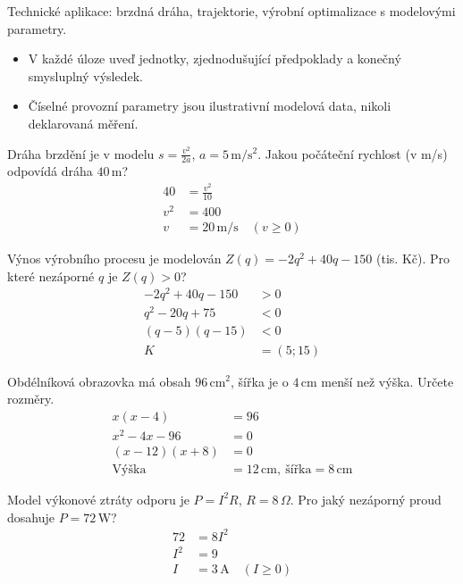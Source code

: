 \documentclass[11pt,a4paper]{article}
\begin{document}
Technické aplikace: brzdná dráha, trajektorie, výrobní optimalizace s modelovými parametry.
\begin{itemize}
\item V každé úloze uveď jednotky, zjednodušující předpoklady a konečný smysluplný výsledek.
\item Číselné provozní parametry jsou ilustrativní modelová data, nikoli deklarovaná měření.
\end{itemize}
\begin{prikladReseniBox}[title={Příklad 1}]
Dráha brzdění je v modelu $s=\frac{v^2}{2a}$, $a=5\,\mathrm{m/s^2}$. Jakou počáteční rychlost (v m/s) odpovídá dráha $40\,\mathrm m$?
\tcblower
\[
\begin{aligned}
40&=\frac{v^2}{10}\\[2pt]
v^2&=400\\[2pt]
v&=20\,\mathrm{m/s}\quad(v\ge0)
\end{aligned}
\]
\end{prikladReseniBox}
\begin{prikladReseniBox}[title={Příklad 2}]
Výnos výrobního procesu je modelován $Z(q)=-2q^2+40q-150$ (tis. Kč). Pro které nezáporné $q$ je $Z(q)>0$?
\tcblower
\[
\begin{aligned}
-2q^2+40q-150&>0\\[2pt]
q^2-20q+75&<0\\[2pt]
(q-5)(q-15)&<0\\[2pt]
K&=(5;15)
\end{aligned}
\]
\end{prikladReseniBox}
\begin{zadaniReseniBox}[title={Samostatná práce 1}]
Obdélníková obrazovka má obsah $96\,\mathrm{cm^2}$, šířka je o $4\,\mathrm{cm}$ menší než výška. Určete rozměry.
\tcblower
\[
\begin{aligned}
x(x-4)&=96\\[2pt]
x^2-4x-96&=0\\[2pt]
(x-12)(x+8)&=0\\[2pt]
\text{Výška}&=12\,\mathrm{cm},\ \text{šířka}=8\,\mathrm{cm}
\end{aligned}
\]
\end{zadaniReseniBox}
\begin{zadaniReseniBox}[title={Samostatná práce 2}]
Model výkonové ztráty odporu je $P=I^2R$, $R=8\,\Omega$. Pro jaký nezáporný proud dosahuje $P=72\,\mathrm W$?
\tcblower
\[
\begin{aligned}
72&=8I^2\\[2pt]
I^2&=9\\[2pt]
I&=3\,\mathrm A\quad(I\ge0)
\end{aligned}
\]
\end{zadaniReseniBox}
\end{document}
